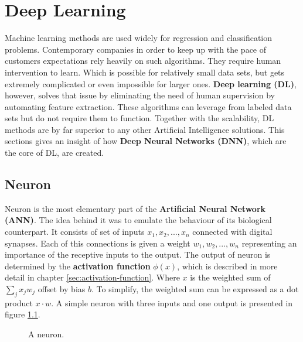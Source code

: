 \chapter{Deep Learning}
\label{cha:dl}

Machine learning methods are used widely for regression and classification problems. Contemporary companies in order to keep up with the pace of customers expectations rely heavily on such algorithms. They require human intervention to learn. Which is possible for relatively small data sets, but gets extremely complicated or even impossible for larger ones. \textbf{Deep learning (DL)}, however, solves that issue by eliminating the need of human supervision by automating feature extraction. These algorithms can leverage from labeled data sets but do not require them to function. Together with the scalability, DL methods are by far superior to any other Artificial Intelligence solutions. This sections gives an insight of how \textbf{Deep Neural Networks (DNN)}, which are the core of DL, are created.


\section{Neuron}
\label{sec:neuron}

Neuron is the most elementary part of the \textbf{Artificial Neural Network (ANN)}. The idea behind it was to emulate the behaviour of its biological counterpart. It consists of set of inputs $x_1, x_2, ..., x_n$ connected with digital synapses. Each of this connections is given a weight $w_1, w_2, ..., w_n$ representing an importance of the receptive inputs to the output. The output of neuron is determined by the \textbf{activation function} $\phi(x)$, which is described in more detail in chapter \ref{sec:activation-function}. Where $x$ is the weighted sum of $\sum_j {x_j}{w_j}$ offset by bias $b$. To simplify, the weighted sum can be expressed as a dot product $x \cdot w$.
A simple neuron with three inputs and one output is presented in figure \ref{fig:neuron}.

\begin{figure}[h]
    \centering
    \caption{A neuron.}
    \label{fig:neuron}
\end{figure}

